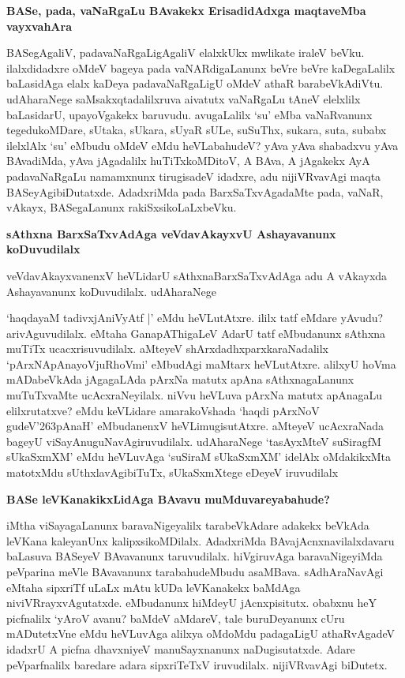 \noindent
{\bf\large{BASe, pada, vaNaRgaLu BAvakekx ErisadidAdxga maqtaveMba vayxvahAra}}\label{page185}

BASegAgaliV, padavaNaRgaLigAgaliV elalxkUkx mwlikate iraleV beVku. ilalxdidadxre oMdeV bageya pada vaNARdigaLanunx beVre beVre kaDegaLalilx baLasidAga elalx kaDeya padavaNaRgaLigU oMdeV athaR barabeVkAdiVtu. udAharaNege saMsakxqtadalilxruva aivatutx vaNaRgaLu tAneV elelxlilx baLasidarU, upayoVgakekx baruvudu. avugaLalilx `su' eMba vaNaRvanunx tegedukoMDare, sUtaka, sUkara, sUyaR sULe, suSuThx, sukara, suta, subabx ilelxlAlx `su' eMbudu oMdeV eMdu heVLabahudeV? yAva yAva shabadxvu yAva BAvadiMda, yAva jAgadalilx huTiTxkoMDitoV, A BAva, A jAgakekx AyA padavaNaRgaLu namamxnunx tirugisadeV idadxre, adu nijiVRvavAgi maqta BASeyAgibiDutatxde. AdadxriMda pada BarxSaTxvAgadaMte pada, vaNaR, vAkayx, BASegaLanunx rakiSxsikoLaLxbeVku.

\noindent
{\bf\large{sAthxna BarxSaTxvAdAga veVdavAkayxvU Ashayavanunx koDuvudilalx}}\label{page186}

veVdavAkayxvanenxV heVLidarU sAthxnaBarxSaTxvAdAga adu A vAkayxda Ashayavanunx koDuvudilalx. udAharaNege

`haqdayaM tadivxjAniVyAtf |'\label{186} eMdu heVLutAtxre. ililx tatf eMdare yAvudu? arivAguvudilalx. eMtaha GanapAThigaLeV AdarU tatf eMbudanunx sAthxna muTiTx ucacxrisuvudilalx. aMteyeV shArxdadhxparxkaraNadalilx `pArxNApAnayoVjuRhoVmi'\label{186} eMbudAgi maMtarx heVLutAtxre. alilxyU hoVma mADabeVkAda jAgagaLAda pArxNa matutx apAna sAthxnagaLanunx muTuTxvaMte ucAcxraNeyilalx. niVvu heVLuva pArxNa matutx apAnagaLu elilxrutatxve? eMdu keVLidare amarakoVshada `haqdi pArxNoV gudeV\char'263pAnaH' eMbudanenxV heVLimugisutAtxre. aMteyeV ucAcxraNada bageyU viSayAnuguNavAgiruvudilalx. udAharaNege `tasAyxMteV suSiragfM sUkaSxmXM'\label{124} eMdu heVLuvAga `suSiraM sUkaSxmXM' idelAlx oMdakikxMta matotxMdu sUthxlavAgibiTuTx, sUkaSxmXtege eDeyeV iruvudilalx

\noindent
{\bf\large{BASe leVKanakikxLidAga BAvavu muMduvareyabahude?}}\label{page186}

iMtha viSayagaLanunx baravaNigeyalilx tarabeVkAdare adakekx beVkAda leVKana kaleyanUnx kalipxsikoMDilalx. AdadxriMda BAvajAcnxnavilalxdavaru baLasuva BASeyeV BAvavanunx taruvudilalx. hiVgiruvAga baravaNigeyiMda peVparina meVle BAvavanunx tarabahudeMbudu asaMBava. sAdhAraNavAgi eMtaha sipxriTf uLaLx mAtu kUDa leVKanakekx baMdAga niviVRrayxvAgutatxde. eMbudanunx hiMdeyU jAcnxpisitutx. obabxnu heY picfnalilx `yAroV avanu? baMdeV aMdareV, tale buruDeyanunx cUru mADutetxVne eMdu heVLuvAga alilxya oMdoMdu padagaLigU athaRvAgadeV idadxrU A picfna dhavxniyeV manuSayxnanunx naDugisutatxde. Adare peVparfnalilx baredare adara sipxriTeTxV iruvudilalx. nijiVRvavAgi biDutetx.


